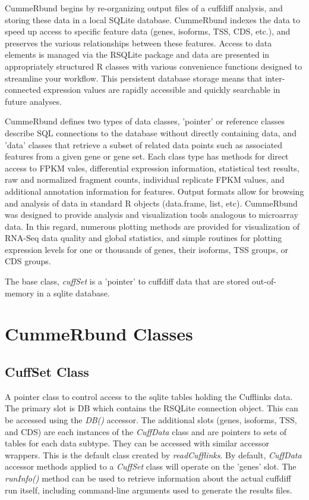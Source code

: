 \documentclass[10pt]{article}
\newcommand{\Rclass}[1]{{\textit{#1}}}
\newcommand{\Rmethod}[1]{{\textit{#1}}}
\begin{document}
	CummeRbund begins by re-organizing output files of a cuffdiff analysis, and storing these data in a local SQLite database. CummeRbund indexes the data to speed up access to specific feature data (genes, isoforms, TSS, CDS, etc.),
	and preserves the various relationships between these features. Access to data elements is managed via the RSQLite package and data are presented in appropriately structured R classes with various convenience functions designed
	to streamline your workflow. This persistent database storage means that inter-connected expression values are rapidly accessible and quickly searchable in future analyses.
	
	CummeRbund defines two types of data classes, 'pointer' or reference classes describe SQL connections to the database without directly containing data, and 'data' classes that retrieve a subset of related data points such as associated
	features from a given gene or gene set. Each class type has methods for direct access to FPKM vales, differential expression information, statistical test results, raw and normalized fragment counts, individual replicate FPKM values, and additional annotation information for features. Output formats allow 
	for browsing and analysis of data in standard R objects (data.frame, list, etc). CummeRbund was designed to provide analysis and visualization tools analogous to microarray data. In this regard, numerous plotting methods are provided for visualization 
	of RNA-Seq data quality and global statistics, and simple routines for plotting expression levels for one or thousands of genes, their isoforms, TSS groups, or CDS groups.
	  
	The base class, \Rclass{cuffSet} is a 'pointer' to cuffdiff data that are stored out-of-memory in a sqlite database.

\clearpage

\section{CummeRbund Classes}

\subsection{CuffSet Class}
	A pointer class to control access to the sqlite tables holding the Cufflinks data. The primary slot is DB which contains the RSQLite connection object. This can be accessed using the \Rmethod{DB()} accessor.
	The additional slots (genes, isoforms, TSS, and CDS) are each instances of the \Rclass{CuffData} class and are pointers to sets of tables for each data subtype. They can be accessed with similar accessor wrappers.
	This is the default class created by \Rmethod{readCufflinks}.  By default, \Rclass{CuffData} accessor methods applied to a \Rclass{CuffSet} class will operate on the 'genes' slot. The \Rmethod{runInfo()} method can be used to retrieve information about
	the actual cuffdiff run itself, including command-line arguments used to generate the results files.
\end{document}
